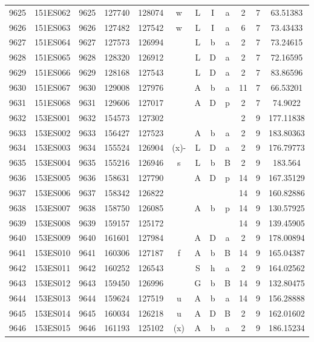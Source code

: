 \begin{tabular}{|*{12}{c|}}
9625 & 151ES062 & 9625 & 127740 & 128074 & w & L & I & a & 2 & 7 & 63.51383 \\ 
9626 & 151ES063 & 9626 & 127482 & 127542 & w & L & I & a & 6 & 7 & 73.43433 \\ 
9627 & 151ES064 & 9627 & 127573 & 126994 &  & L & b & a & 2 & 7 & 73.24615 \\ 
9628 & 151ES065 & 9628 & 128320 & 126912 &  & L & D & a & 2 & 7 & 72.16595 \\ 
9629 & 151ES066 & 9629 & 128168 & 127543 &  & L & D & a & 2 & 7 & 83.86596 \\ 
9630 & 151ES067 & 9630 & 129008 & 127976 &  & A & b & a & 11 & 7 & 66.53201 \\ 
9631 & 151ES068 & 9631 & 129606 & 127017 &  & A & D & p & 2 & 7 & 74.9022 \\ 
9632 & 153ES001 & 9632 & 154573 & 127302 &  &  &  &  & 2 & 9 & 177.11838 \\ 
9633 & 153ES002 & 9633 & 156427 & 127523 &  & A & b & a & 2 & 9 & 183.80363 \\ 
9634 & 153ES003 & 9634 & 155524 & 126904 & (x)- & L & D & a & 2 & 9 & 176.79773 \\ 
9635 & 153ES004 & 9635 & 155216 & 126946 & s & L & b & B & 2 & 9 & 183.564 \\ 
9636 & 153ES005 & 9636 & 158631 & 127790 &  & A & D & p & 14 & 9 & 167.35129 \\ 
9637 & 153ES006 & 9637 & 158342 & 126822 &  &  &  &  & 14 & 9 & 160.82886 \\ 
9638 & 153ES007 & 9638 & 158750 & 126085 &  & A & b & p & 14 & 9 & 130.57925 \\ 
9639 & 153ES008 & 9639 & 159157 & 125172 &  &  &  &  & 14 & 9 & 139.45905 \\ 
9640 & 153ES009 & 9640 & 161601 & 127984 &  & A & D & a & 2 & 9 & 178.00894 \\ 
9641 & 153ES010 & 9641 & 160306 & 127187 & f & A & b & B & 14 & 9 & 165.04387 \\ 
9642 & 153ES011 & 9642 & 160252 & 126543 &  & S & h & a & 2 & 9 & 164.02562 \\ 
9643 & 153ES012 & 9643 & 159450 & 126996 &  & G & b & B & 14 & 9 & 132.80475 \\ 
9644 & 153ES013 & 9644 & 159624 & 127519 & u & A & b & a & 14 & 9 & 156.28888 \\ 
9645 & 153ES014 & 9645 & 160034 & 126218 & u & A & D & B & 2 & 9 & 162.01602 \\ 
9646 & 153ES015 & 9646 & 161193 & 125102 & (x) & A & b & a & 2 & 9 & 186.15234 \\ 

\end{tabular}
